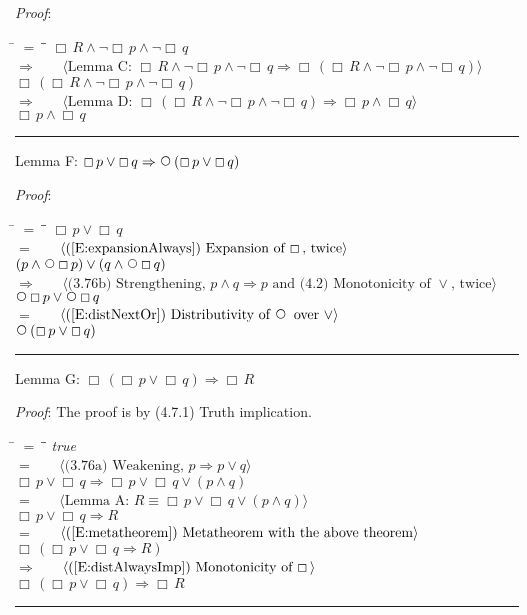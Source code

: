 \documentclass[12pt, fleqn, leqno]{article}
\newcommand{\lgap}{2pt}                             %
\newcommand{\mymathindent}{24pt}                    %
\newcommand{\impl}{\ensuremath{\Rightarrow}}        %
\newcommand{\Next}{\;\,\text{\raisebox{3.5pt}{\circle{6}}}}
\newcommand{\Always}{\Box\,}
\newcommand{\myqed}{\rule[-.23ex]{1.2ex}{2.0ex}}
\newcommand{\myqedtab}{\hspace{384pt}}              %
\newcommand{\Gll} {\langle}                         %
\newcommand{\Ggg} {\rangle}                         %
\newcommand{\Hint}[1]     {\ \ \ $\Gll              \mbox{#1} \Ggg$ }   %
\begin{document}
{\emph{Proof}:
\begin{tabbing}
\hspace{\mymathindent} \= $= \;$ \= \myqedtab \= \kill
  \> \>   $\Always R \land \neg \Always p \land \neg \Always q$\\[\lgap]
  \> $\impl$  \>  \Hint{Lemma C: $\Always R \land \neg \Always p \land \neg \Always q \impl \Always (\Always R \land \neg \Always p \land \neg \Always q)$}\\[\lgap]
  \> \>   $\Always (\Always R \land \neg \Always p \land \neg \Always q)$\\[\lgap]
  \> $\impl$  \>  \Hint{Lemma D: $\Always (\Always R \land \neg \Always p \land \neg \Always q) \impl \Always p \land \Always q$}\\[\lgap]
  \> \>   $\Always p \land \Always q$ \quad \myqed
\end{tabbing}
Lemma F: $\Always p \lor \Always q \impl \Next (\Always p \lor \Always q)$

\emph{Proof}:
\begin{tabbing}
\hspace{\mymathindent} \= $= \;$ \= \myqedtab \= \kill
  \> \>   $\Always p \lor \Always q$\\[\lgap]
  \> $=$  \>  \Hint{(\ref{E:expansionAlways}) Expansion of $\Always$, twice}\\[\lgap]
  \> \>   $(p \land \Next \Always p) \lor (q \land \Next \Always q)$\\[\lgap]
  \> $\impl$ \> \Hint{(3.76b) Strengthening, $p \land q \impl p$ and (4.2) Monotonicity of $\lor$, twice}\\[\lgap]
  \> \>   $\Next \Always p \lor \Next \Always q$\\[\lgap]
  \> $=$  \>  \Hint{(\ref{E:distNextOr}) Distributivity of $\Next$ over $\lor$}\\[\lgap]
  \> \>   $\Next (\Always p \lor \Always q)$ \quad \myqed
\end{tabbing}
Lemma G: $\Always (\Always p \lor \Always q) \impl \Always R$

\emph{Proof}: The proof is by (4.7.1) Truth implication.
\begin{tabbing}
\hspace{\mymathindent} \= $= \;$ \= \myqedtab \= \kill
  \> \>   \textit{true}\\[\lgap]
  \> $=$ \> \Hint{(3.76a) Weakening, $p\impl p\lor q$}\\[\lgap]
  \> \> $\Always p \lor \Always q \impl \Always p \lor \Always q \lor (p \land q)$\\[\lgap]
  \> $=$ \> \Hint{Lemma A: $R \equiv \Always p \lor \Always q \lor (p \land q)$}\\[\lgap]
  \> \> $\Always p \lor \Always q \impl R$\\[\lgap]
  \> $=$ \> \Hint{(\ref{E:metatheorem}) Metatheorem with the above theorem}\\[\lgap]
  \> \>   $\Always (\Always p \lor \Always q \impl R)$\\[\lgap]
  \> $\impl$  \>  \Hint{(\ref{E:distAlwaysImp}) Monotonicity of $\Always$}\\[\lgap]
  \> \>   $\Always (\Always p \lor \Always q) \impl \Always R$ \quad \myqed
\end{tabbing}

}
\end{document}
